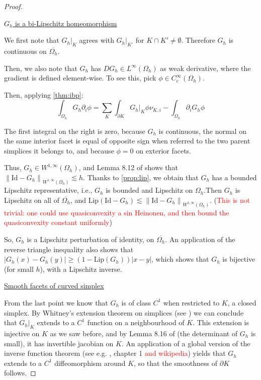 \documentclass[english,a4paper,9pt,oneside]{scrbook}	%
\theoremstyle{break}
\newenvironment{mproof}[1][\proofname]{%
  \begin{proof}[#1]$ $\par\nobreak\ignorespaces
}{%
  \end{proof}
}
\renewcommand*{\proofname}{Proof}
\theoremstyle{remark}
\newcommand{\norm}[1]{\left\lVert#1\right\rVert}
\newcommand{\id}{\text{Id}}
\begin{document}
\begin{appendices}
\begin{mproof}
\underline{$G_h$ is a bi-Lipschitz homeomorphism}

We first note that $G_h|_K$ agrees with $G_h|_{K'}$ for $K\cap K' \neq \emptyset$. Therefore $G_h$ is continuous on $\overline{\Omega_h}$.

Then, we also note that $G_h$ has $DG_h \in L^\infty(\Omega_h)$ as weak derivative, where the gradient is defined element-wise. To see this, pick $\phi \in C^\infty_c(\Omega_h)$.

Then, applying \cref{thm:ibp}:
$$\int_{\Omega_h} G_h \partial_i \phi = \sum_K \int_{\partial K}G_h|_{K} \phi \nu_{K,i}  - \int_{\Omega_h}\partial_i G_h \phi$$

The first integral on the right is zero, because $G_h$ is continuous, the normal on the same interior facet is equal of opposite sign when referred to the two parent simplices it belongs to, and because $\phi=0$ on exterior facets.

Thus, $G_h \in W^{1,\infty}(\Omega_h)$, and Lemma 8.12 of \cite{ranner} shows that $\norm{\id -G_h}_{W^{1,\infty}(\Omega_h)}\lesssim h$. Thanks to \cref{prop:lip}, we obtain that $G_h$ has a bounded Lipschitz representative, i.e., $G_h$ is bounded and Lipschitz on $\Omega_h$.Then $G_h$ is Lipschitz on all of $\overline{\Omega_h}$, and $\text{Lip}(\id -G_h) \lesssim  \norm{\id -G_h}_{W^{1,\infty}(\Omega_h)}$. (\textcolor{red}{This is not trivial: one could use quasiconvexity a sin Heinonen, and then bound the quasiconvexity constant uniformly})

So, $G_h$ is a Lipschitz perturbation of identity, on $\overline{\Omega_h}$.  An application of the reverse triangle inequality also shows that $|G_h(x)-G_h(y)|\geq (1-\text{Lip}(G_h))|x-y|$, which shows that $G_h$ is bijective (for small $h$), with a Lipschitz inverse.



\underline{Smooth facets of curved simplex}

From the last point we know that $G_h$ is of class $C^1$ when restricted to $K$, a closed simplex. By Whitney's extension theorem on simplices (see \cite{whitney}) we can conclude that $G_h|_K$ extends to a $C^1$ function on a neighbourhood of $K$. This extension is injective on $K$ as we saw before, and by Lemma 8.16 of \cite{ranner} (the determinant of $G_h$ is small), it has invertible jacobian on $K$. An application of a global version of the inverse function theorem (see e.g. \cite{pollack}, chapter 1 \textcolor{red}{and wikipedia}) yields that $G_h$ extends to a $C^1$ diffeomorphism around $K$, so that the smoothness of $\partial K$ follows.


\end{mproof}
\end{appendices}
\end{document}
